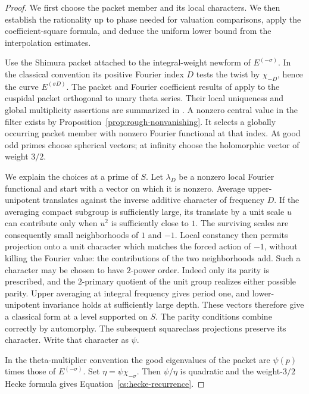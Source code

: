 \begin{proof}
We first choose the packet member and its local characters. We then
establish the rationality up to phase needed for valuation comparisons,
apply the coefficient-square formula, and deduce the uniform lower bound
from the interpolation estimates.

Use the Shimura packet attached to the integral-weight newform of
$E^{(-\sigma)}$.  In the classical convention its positive Fourier index
$D$ tests the twist by $\chi_{-D}$, hence the curve $E^{(\sigma D)}$.
The packet and Fourier coefficient results of
\citet{Waldspurger1980,Waldspurger1981} apply to the cuspidal packet
orthogonal to unary theta series.  Their local uniqueness and global
multiplicity assertions are summarized in
\citep[Sections~3.1 and~5.1]{Waldspurger1983}.
A nonzero central value in the filter exists by
Proposition~\ref{prop:rough-nonvanishing}.  It selects a globally occurring
packet member with nonzero Fourier functional at that index.  At good
odd primes choose spherical vectors; at infinity choose the holomorphic
vector of weight $3/2$.

We explain the choices at a prime of $S$.  Let $\lambda_D$ be a nonzero
local Fourier functional and start with a vector on which it is nonzero.
Average upper-unipotent translates against the inverse additive character
of frequency $D$.  If the averaging compact subgroup is sufficiently
large, its translate by a unit scale $u$ can contribute only when $u^2$
is sufficiently close to $1$.  The surviving scales are consequently
small neighborhoods of $1$ and $-1$.  Local constancy then permits
projection onto a unit character which matches the forced action of
$-1$, without killing the Fourier value: the contributions of the two
neighborhoods add.  Such a character may be chosen to have $2$-power
order.  Indeed only its parity is prescribed, and the $2$-primary
quotient of the unit group realizes either possible parity.  Upper
averaging at integral frequency gives period one, and lower-unipotent
invariance holds at sufficiently large depth.  These vectors therefore
give a classical form at a level supported on $S$.  The parity conditions
combine correctly by automorphy.  The subsequent squareclass projections
preserve its character.  Write that character as $\psi$.

In the theta-multiplier convention the good eigenvalues of the packet
are $\psi(p)$ times those of $E^{(-\sigma)}$.  Set
$\eta=\psi\chi_{-\sigma}$.  Then $\psi/\eta$ is quadratic and the
weight-$3/2$ Hecke formula gives Equation~\eqref{cs:hecke-recurrence}.


\end{proof}
